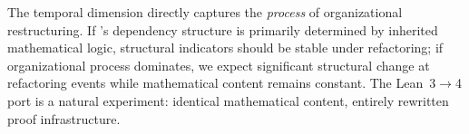
The temporal dimension directly captures the \emph{process} of organizational restructuring. If 's dependency structure is primarily determined by inherited mathematical logic, structural indicators should be stable under refactoring; if organizational process dominates, we expect significant structural change at refactoring events while mathematical content remains constant. The Lean~3$\to$4 port is a natural experiment: identical mathematical content, entirely rewritten proof infrastructure.
